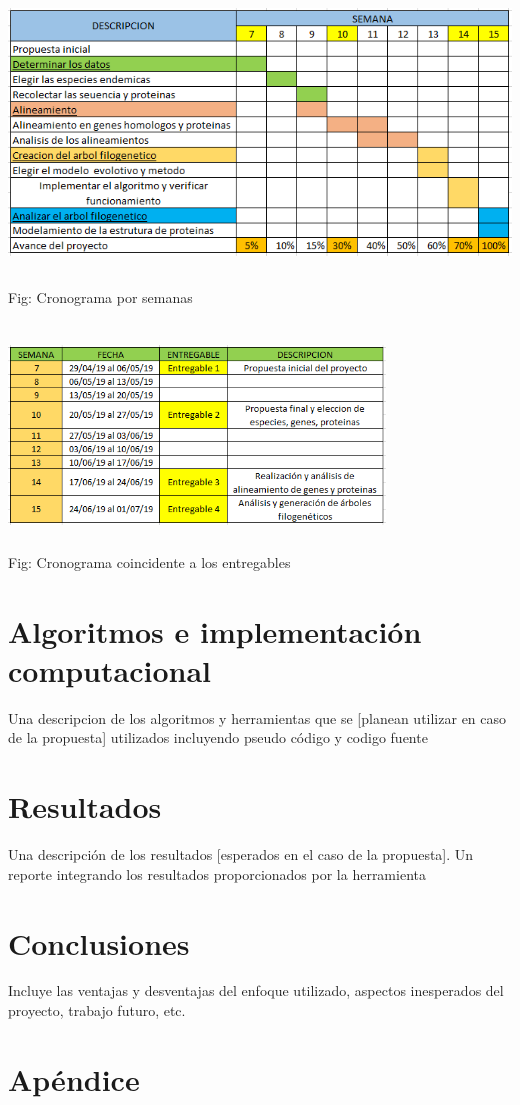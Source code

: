 \documentclass[a4paper]{article}
\begin{document}
\begin{center}
	\includegraphics[width=14cm,height=8cm]{cronoextendido.png}\\
	Fig: Cronograma por semanas	
\end{center}

\begin{center}
	\includegraphics[width=10cm,height=6cm]{cronoentregrable.png}\\
	Fig: Cronograma coincidente a los entregables
\end{center}


\vspace*{0.2in}


\section{Algoritmos e implementación computacional}
Una descripcion de los algoritmos y herramientas que se [planean utilizar en caso de la propuesta] utilizados incluyendo pseudo código y codigo fuente
\section{Resultados}
Una descripción de los resultados [esperados en el caso de la propuesta]. Un reporte integrando los resultados proporcionados por la herramienta
\section{Conclusiones}
Incluye las ventajas y desventajas del enfoque utilizado, aspectos inesperados del proyecto, trabajo futuro, etc.
\section{Apéndice}
\end{document}
